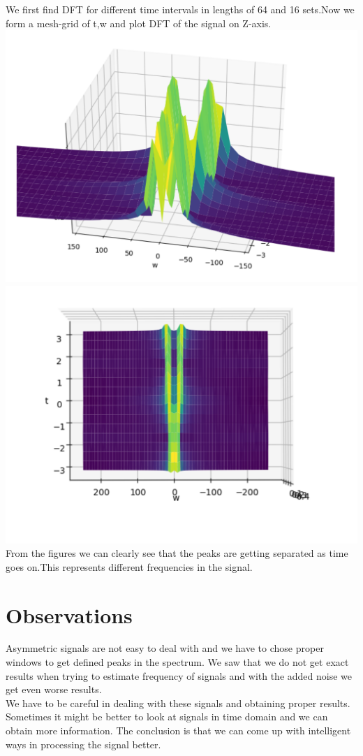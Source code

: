 \documentclass[10pt,english, openany]{book}
\begin{document}
We first find DFT for different time intervals in lengths of 64 and 16 sets.Now we form a mesh-grid of t,w and plot DFT of the signal on Z-axis.\\
{\centering \includegraphics[scale=0.3]{Figure8.png}}\\
{\centering \includegraphics[scale=0.3]{Figure9.png}}\\
From the figures we can clearly see that the peaks are getting separated as time goes on.This represents different frequencies in the signal.\\

\chapter{Observations}
Asymmetric signals are not easy to deal with and we have to chose proper windows to get defined peaks in the spectrum. We saw that we do not get exact results when trying to estimate frequency of signals and with the added noise we get even worse results. \\We have to be careful in dealing with these signals and obtaining proper results. \\Sometimes it might be better to look at signals in time domain and we can obtain more information. The conclusion is that we can come up with intelligent ways in processing the signal better.\\
\end{document}
